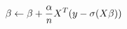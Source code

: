 \documentclass[preview]{standalone}
\begin{document}
\begin{align*}
\special{dvisvgm:raw <g id='unique000'>}\beta\leftarrow\beta+\frac{\alpha}{n}X^T(y-\sigma(X\beta))\special{dvisvgm:raw </g>}
\end{align*}
\end{document}
